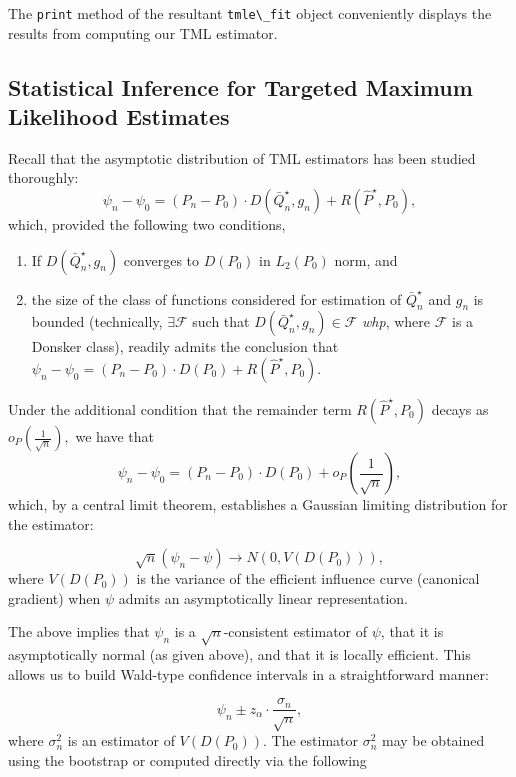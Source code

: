 \documentclass[
  12pt, krantz2,
]{krantz}
\newcommand{\passthrough}[1]{#1}
\providecommand{\tightlist}{%
  \setlength{\itemsep}{0pt}\setlength{\parskip}{0pt}}
\theoremstyle{definition}
\theoremstyle{definition}
\theoremstyle{definition}
\newcommand{\1}{\mathbbm{1}}
\begin{document}
The \passthrough{\lstinline!print!} method of the resultant \passthrough{\lstinline!tmle\_fit!} object conveniently displays the
results from computing our TML estimator.

\hypertarget{statistical-inference-for-targeted-maximum-likelihood-estimates}{%
\subsection{Statistical Inference for Targeted Maximum Likelihood Estimates}\label{statistical-inference-for-targeted-maximum-likelihood-estimates}}

Recall that the asymptotic distribution of TML estimators has been studied
thoroughly:
\[\psi_n - \psi_0 = (P_n - P_0) \cdot D(\bar{Q}_n^{\star}, g_n) +
R(\hat{P}^{\star}, P_0),\]
which, provided the following two conditions,

\begin{enumerate}
\def\labelenumi{\arabic{enumi}.}
\tightlist
\item
  If \(D(\bar{Q}_n^{\star}, g_n)\) converges to \(D(P_0)\) in \(L_2(P_0)\) norm, and
\item
  the size of the class of functions considered for estimation of
  \(\bar{Q}_n^{\star}\) and \(g_n\) is bounded (technically, \(\exists \mathcal{F}\)
  such that \(D(\bar{Q}_n^{\star}, g_n) \in \mathcal{F}\) \emph{whp}, where
  \(\mathcal{F}\) is a Donsker class),
  readily admits the conclusion that
  \(\psi_n - \psi_0 = (P_n - P_0) \cdot D(P_0) + R(\hat{P}^{\star}, P_0)\).
\end{enumerate}

Under the additional condition that the remainder term \(R(\hat{P}^{\star}, P_0)\)
decays as \(o_P \left( \frac{1}{\sqrt{n}} \right),\) we have that
\[\psi_n - \psi_0 = (P_n - P_0) \cdot D(P_0) + o_P \left( \frac{1}{\sqrt{n}}
\right),\]
which, by a central limit theorem, establishes a Gaussian limiting distribution
for the estimator:

\[\sqrt{n}(\psi_n - \psi) \to N(0, V(D(P_0))),\]
where \(V(D(P_0))\) is the variance of the efficient influence curve (canonical
gradient) when \(\psi\) admits an asymptotically linear representation.

The above implies that \(\psi_n\) is a \(\sqrt{n}\)-consistent estimator of \(\psi\),
that it is asymptotically normal (as given above), and that it is locally
efficient. This allows us to build Wald-type confidence intervals in a
straightforward manner:

\[\psi_n \pm z_{\alpha} \cdot \frac{\sigma_n}{\sqrt{n}},\]
where \(\sigma_n^2\) is an estimator of \(V(D(P_0))\). The estimator \(\sigma_n^2\)
may be obtained using the bootstrap or computed directly via the following
\end{document}
